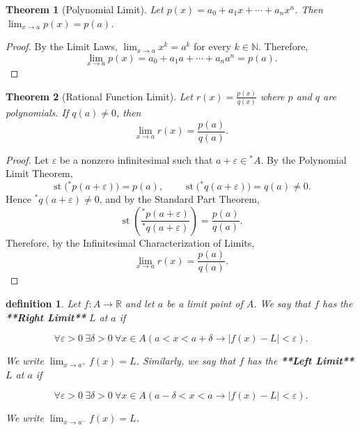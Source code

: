 \documentclass[10pt,a4paper]{book}
\newtheorem{definition}{definition}[section]
\newtheorem{theorem}{Theorem}[section]
\begin{document}
\begin{theorem}[Polynomial Limit]

    Let $p(x)=a_0+a_1x+\cdots+a_nx^n$. Then $\lim_{x\to a}p(x)=p(a)$.

\end{theorem}

\begin{proof}

    By the Limit Laws, $\lim_{x\to a}x^k=a^k$ for every $k\in\mathbb N$. Therefore,
    $$ \lim_{x\to a}p(x) = a_0+a_1a+\cdots+a_na^n = p(a). $$

\end{proof}

\begin{theorem}[Rational Function Limit]

    Let $r(x)=\frac{p(x)}{q(x)}$ where $p$ and $q$ are polynomials. If $q(a)\neq0$,
    then $$ \lim_{x\to a}r(x)=\frac{p(a)}{q(a)}. $$

\end{theorem}

\begin{proof}

    Let $\varepsilon$ be a nonzero infinitesimal such that $a+\varepsilon\in{}^*A$.
    By the Polynomial Limit Theorem, $$
        \operatorname{st}\bigl({}^*p(a+\varepsilon)\bigr)=p(a), \qquad
        \operatorname{st}\bigl({}^*q(a+\varepsilon)\bigr)=q(a)\neq0. $$ Hence
    ${}^*q(a+\varepsilon)\neq0$, and by the Standard Part Theorem, $$
        \operatorname{st}\left( \frac{{}^*p(a+\varepsilon)} {{}^*q(a+\varepsilon)}
        \right) = \frac{p(a)}{q(a)}. $$ Therefore, by the Infinitesimal
    Characterization of Limits, $$ \lim_{x\to a}r(x)=\frac{p(a)}{q(a)}. $$

\end{proof}
\begin{definition}

    Let $f:A\to\mathbb R$ and let $a$ be a limit point of $A$. We say that $f$ has
    the \textbf{**Right Limit**} $L$ at $a$ if

    $$
        \forall\varepsilon>0\
        \exists\delta>0\ \forall x\in A \left( a<x<a+\delta \to |f(x)-L|<\varepsilon
        \right).
    $$

    We write $\lim_{x\to a^+}f(x)=L$. Similarly, we say that $f$ has the
    \textbf{**Left Limit**} $L$ at $a$ if

    $$
        \forall\varepsilon>0\ \exists\delta>0\
        \forall x\in A \left( a-\delta<x<a \to |f(x)-L|<\varepsilon \right).
    $$

    We write $\lim_{x\to a^-}f(x)=L$.

\end{definition}
\end{document}
